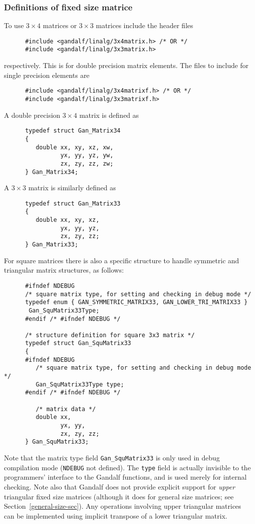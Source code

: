\subsubsection{Definitions of fixed size matrice}\label{fixed34-sec}
To use $3\times 4$ matrices or $3\times 3$ matrices
include the header files
\begin{verbatim}
      #include <gandalf/linalg/3x4matrix.h> /* OR */
      #include <gandalf/linalg/3x3matrix.h>
\end{verbatim}
respectively. This is for double precision matrix elements.
The files to include for single precision elements are
\begin{verbatim}
      #include <gandalf/linalg/3x4matrixf.h> /* OR */
      #include <gandalf/linalg/3x3matrixf.h>
\end{verbatim}
A double precision $3\times 4$ matrix is defined as
\begin{verbatim}
      typedef struct Gan_Matrix34
      {
         double xx, xy, xz, xw,
                yx, yy, yz, yw,
                zx, zy, zz, zw;
      } Gan_Matrix34;
\end{verbatim}
A $3\times 3$ matrix is similarly defined as
\begin{verbatim}
      typedef struct Gan_Matrix33
      {
         double xx, xy, xz,
                yx, yy, yz,
                zx, zy, zz;
      } Gan_Matrix33;
\end{verbatim}
For square matrices there is also a specific structure to handle symmetric
and triangular matrix structures, as follows:
\begin{verbatim}
      #ifndef NDEBUG
      /* square matrix type, for setting and checking in debug mode */
      typedef enum { GAN_SYMMETRIC_MATRIX33, GAN_LOWER_TRI_MATRIX33 }
       Gan_SquMatrix33Type;
      #endif /* #ifndef NDEBUG */

      /* structure definition for square 3x3 matrix */
      typedef struct Gan_SquMatrix33
      {
      #ifndef NDEBUG
         /* square matrix type, for setting and checking in debug mode */
         Gan_SquMatrix33Type type;
      #endif /* #ifndef NDEBUG */

         /* matrix data */
         double xx,
                yx, yy,
                zx, zy, zz;
      } Gan_SquMatrix33;
\end{verbatim}
Note that the matrix type field {\tt Gan\_SquMatrix33} is only used in
debug compilation mode ({\tt NDEBUG} not defined). The {\tt type} field is
actually invisible to the programmers' interface to the Gandalf functions,
and is used merely for internal checking. Note also that Gandalf does not
provide explicit support for {\em upper} triangular fixed size matrices
(although it does for general size matrices;
see Section~\ref{general-size-sec}). Any operations involving upper triangular
matrices can be implemented using implicit transpose of a lower triangular
matrix.

